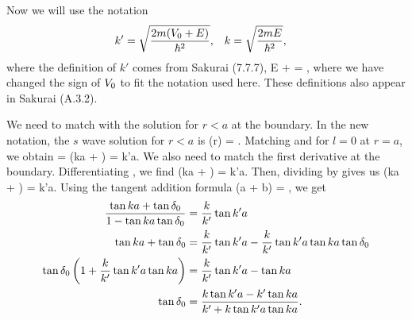\begin{solution}
	Now we will use the notation
	\begin{align} \label{kk}
		k' &= \sqrt{\frac{2m (V_0 + E)}{\hbar^2}}, &
		k &= \sqrt{\frac{2m E}{\hbar^2}},
	\end{align}
	where the definition of $k'$ comes from Sakurai (7.7.7),
	\beq
		E + \Vo = ,
	\eeq
	where we have changed the sign of $V_0$ to fit the notation used here.  These definitions also appear in Sakurai (A.3.2).
	
	We need to match  with the solution for $r < a$ at the boundary.  In the new notation, the $s$ wave solution for $r < a$ is
	\beqn \label{inside}
		\Ro(r) = \Bo {}.
	\eeqn
	Matching  and  for $l = 0$ at $r = a$, we obtain
	\beqn \label{cont}
		\Ao {} = \Bo {}
		\qimplies
		\sin(ka + \delo) =  \sin k'a.
	\eeqn
	We also need to match the first derivative at the boundary.  Differentiating , we find
	\beqn \label{dcont}
		\cos(ka + \delo) =  \cos k'a.
	\eeqn
	Then, dividing  by  gives us
	\beq
		\tan(ka + \delo) =  \tan k'a.
	\eeq
	Using the tangent addition formula
	\beq
		\tan(a + b) = ,
	\eeq
	we get
	\begin{align}
		\frac{\tan ka + \tan \delta_0}{1 - \tan ka \tan \delta_0} &= \frac{k}{k'} \tan k'a \notag \\
		\tan ka + \tan \delta_0 &= \frac{k}{k'} \tan k'a - \frac{k}{k'} \tan k'a \tan ka \tan \delta_0 \notag \\
		\tan \delta_0 \left( 1 + \frac{k}{k'} \tan k'a \tan ka \right) &= \frac{k}{k'} \tan k'a - \tan ka \notag \\
		\tan \delta_0 &= \frac{k \tan k' a - k' \tan ka}{k' + k \tan k' a \tan ka}. \label{delo}
	\end{align}
	

\end{solution}
